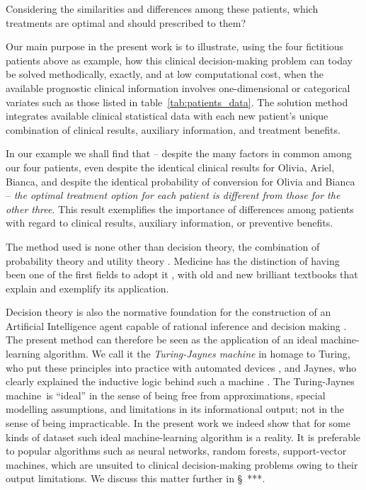 \documentclass[utf8]{FrontiersinHarvard} %
\newcommand*{\wrench}{{\fontencoding{U}\fontfamily{fontawesomethree}\selectfont\symbol{114}}}
\newcommand{\mynotew}[1]{{\color{notecolour}\wrench\ #1}}
\newcommand*{\sect}{\S}%
\newcommand*{\chap}{ch.}%
\newcommand*{\chaps}{chs}%
\renewcommand*{\|}[1][]{\nonscript\:#1\vert\nonscript\:\mathopen{}}
\newcommand*{\tjm}{Turing-Jaynes machine}
\begin{document}
\medskip

Considering the similarities and differences among these patients, which treatments are optimal and should prescribed to them?

\medskip

Our main purpose in the present work is to illustrate, using the four fictitious patients above as example, how this clinical decision-making problem can today be solved methodically, exactly, and at low computational cost, when the available prognostic clinical information involves one-dimensional or categorical variates such as those listed in table~\ref{tab:patients_data}. The solution method integrates available clinical statistical data with each new patient's unique combination of clinical results, auxiliary information, and treatment benefits. %

In our example we shall find that -- despite the many factors in common among our four patients, even despite the identical clinical results for Olivia, Ariel, Bianca, and despite the identical probability of conversion for Olivia and Bianca -- \emph{the optimal treatment option for each patient is different from those for the other three}. This result exemplifies the importance of differences among patients with regard to clinical results, auxiliary information, or preventive benefits.

The method used is none other than decision theory, the combination of probability theory and utility theory \citep[\chaps~13--14]{vonneumannetal1944_r1955,raiffaetal1961_r2000,raiffa1968_r1970,lindley1971_r1988,kreps1988,jaynes1994_r2003}. Medicine has the distinction of having been one of the first fields to adopt it \citep{ledleyetal1959}, with old and new brilliant textbooks \citep{weinsteinetal1980,soxetal1988_r2013,huninketal2001_r2014} that explain and exemplify its application.

Decision theory is also the normative foundation for the construction of an Artificial Intelligence agent capable of rational inference and decision making \citetext{\citealp[\chap~IV]{russelletal1995_r2022}; \citealp[\chaps~1--2]{jaynes1994_r2003}}. The present method can therefore be seen as the application of an ideal machine-learning algorithm. We call it the \emph{Turing-Jaynes machine}  in homage to Turing, who put these principles into practice with automated devices \citep{good1979}, and Jaynes, who clearly explained the inductive logic behind such a machine \citep{jaynes1994_r2003}. The \tjm\ is \enquote{ideal} in the sense of being free from approximations, special modelling assumptions, and limitations in its informational output; not in the sense of being impracticable. In the present work we indeed show that for some kinds of dataset such ideal machine-learning algorithm is a reality. It is preferable to popular algorithms such as neural networks, random forests, support-vector machines, which are unsuited to clinical decision-making problems owing to their output limitations. We discuss this matter further in \sect\mynotew{***}.
\end{document}
